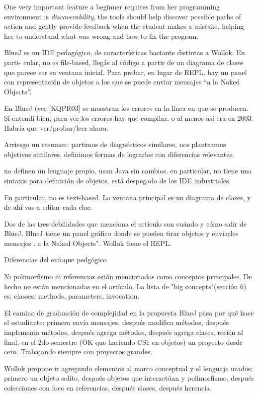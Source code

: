 One very important feature a beginner requires from her programming environment is \emph{discoverability}, 
\ie the tools should help discover possible paths of action and gently provide feedback when the student makes a mistake, 
helping her to understand what was wrong and how to fix the program.



BlueJ es un IDE pedagógico, de características bastante distintas a Wollok. En parti-
cular, no es file-based, llegás al código a partir de un diagrama de clases que parece ser
su ventana inicial. Para probar, en lugar de REPL, hay un panel con representación de
objetos a los que se puede enviar mensajes “a la Naked Objects”.

En BlueJ (ver [KQPR03] se muestran los errores en la línea en que se producen. Si
entendí bien, para ver los errores hay que compilar, o al menos así era en 2003. Habría
que ver/probar/leer ahora.

Arriesgo un resumen: partimos de diagnósticos similares, nos planteamos objetivos
similares, definimos formas de lograrlos con diferencias relevantes.

no definen un lenguaje propio, usan Java sin cambios.
en particular, no tiene una sintaxis para definición de objetos.
está despegado de los IDE industriales. 

En particular, no es text-based. La ventana
principal es un diagrama de clases, y de ahí vas a editar cada clae. 

Dos de las tres debilidades que menciona el artículo son cuándo y cómo salir de BlueJ.
BlueJ tiene un panel gráfico donde se pueden tirar objetos y enviarles mensajes . a
la Naked Objects". Wollok tiene el REPL.

Diferencias del enfoque pedgógico

Ni polimorfismo ni referencias están mencionados como conceptos principales. De
hecho no están mencionadas en el artículo. La lista de "big concepts"(sección 6) es:
classes, methods, parameters, invocation.

El camino de graduación de complejidad en la propuesta BlueJ pasa por qué hace el
estudiante: primero envía mensajes, después modifica métodos, después implementa
métodos, después agrega métodos, después agrega clases, 
recién al final, en el 2do
semestre (OK que haciendo CS1 en objetos) un proyecto desde cero. 
Trabajando siempre con proyectos grandes. 

Wollok propone ir agregando elementos al marco conceptual y el lenguaje usados: 
primero un objeto solito, después objetos que interactúan y polimorfismo, 
después colecciones con foco en referencias, después clases, después herencia.

